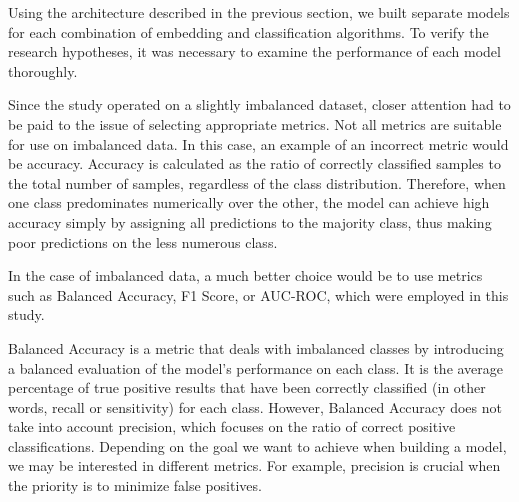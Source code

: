 Using the architecture described in the previous section, we built separate models for each combination of embedding and classification algorithms. To verify the research hypotheses, it was necessary to examine the performance of each model thoroughly.

Since the study operated on a slightly imbalanced dataset, closer attention had to be paid to the issue of selecting appropriate metrics. Not all metrics are suitable for use on imbalanced data. In this case, an example of an incorrect metric would be accuracy. Accuracy is calculated as the ratio of correctly classified samples to the total number of samples, regardless of the class distribution. Therefore, when one class predominates numerically over the other, the model can achieve high accuracy simply by assigning all predictions to the majority class, thus making poor predictions on the less numerous class.

In the case of imbalanced data, a much better choice would be to use metrics such as Balanced Accuracy, F1 Score, or AUC-ROC, which were employed in this study.

Balanced Accuracy is a metric that deals with imbalanced classes by introducing a balanced evaluation of the model's performance on each class. It is the average percentage of true positive results that have been correctly classified (in other words, recall or sensitivity) for each class. However, Balanced Accuracy does not take into account precision, which focuses on the ratio of correct positive classifications. Depending on the goal we want to achieve when building a model, we may be interested in different metrics. For example, precision is crucial when the priority is to minimize false positives.


